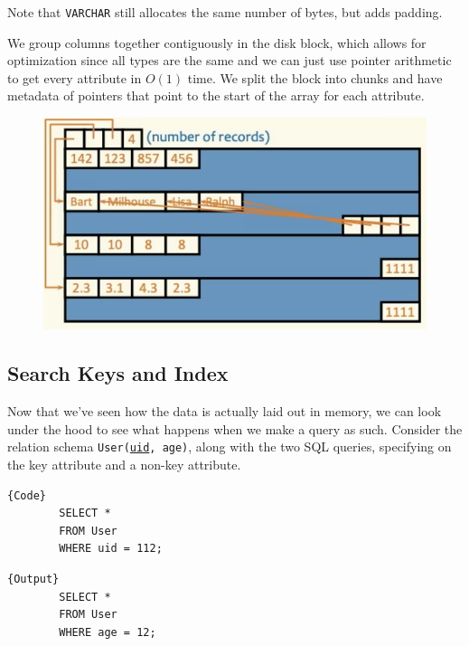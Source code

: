 \documentclass{article}
\begin{document}
    Note that \texttt{VARCHAR} still allocates the same number of bytes, but adds padding. 

    \begin{definition}
      We group columns together contiguously in the disk block, which allows for optimization since all types are the same and we can just use pointer arithmetic to get every attribute in $O(1)$ time. We split the block into chunks and have metadata of pointers that point to the start of the array for each attribute. 

      \begin{figure}[H]
        \centering 
        \includegraphics[scale=0.6]{img/column_major.png}
        \caption{} 
        \label{fig:column_major}
      \end{figure}
    \end{definition}

  \subsection{Search Keys and Index} 

    Now that we've seen how the data is actually laid out in memory, we can look under the hood to see what happens when we make a query as such. Consider the relation schema \texttt{User(\underline{uid}, age)}, along with the two SQL queries, specifying on the key attribute and a non-key attribute. 
    
    \noindent\begin{minipage}{.5\textwidth}
      \begin{lstlisting}[]{Code}
        SELECT * 
        FROM User 
        WHERE uid = 112;
      \end{lstlisting}
      \end{minipage}
      \hfill
      \begin{minipage}{.49\textwidth}
      \begin{lstlisting}[]{Output}
        SELECT * 
        FROM User 
        WHERE age = 12;
      \end{lstlisting}
    \end{minipage} 
\end{document}
